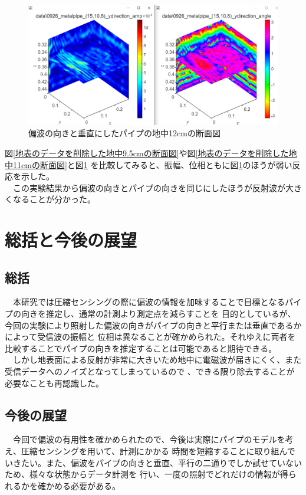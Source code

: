 \documentclass[12pt,a4paper]{jsreport}
\begin{document}
        \begin{figure}[h]
          \begin{center}
           \includegraphics[width=14cm]{dataimage/matlab/0918_metalpipe_(15,10,8)_ydirection_d=35cm_delete_unnecessary.png}
          \caption{偏波の向きと垂直にしたパイプの地中12cmの断面図}\label{偏波の向きと垂直にしたパイプの地中12.5cmの断面図}
          \end{center}
          \end{figure}

図\ref{地表のデータを削除した地中9.5cmの断面図}や図\ref{地表のデータを削除した地中11cmの断面図}と図\ref{偏波の向きと垂直にしたパイプの地中12.5cmの断面図}
を比較してみると、振幅、位相ともに図\ref{偏波の向きと垂直にしたパイプの地中12.5cmの断面図}のほうが弱い反応を示した。
\\　この実験結果から偏波の向きとパイプの向きを同じにしたほうが反射波が大きくなることが分かった。

\clearpage
\chapter{総括と今後の展望}
\section{総括}
　本研究では圧縮センシングの際に偏波の情報を加味することで目標となるパイプの向きを推定し、通常の計測より測定点を減らすことを
目的としているが、今回の実験により照射した偏波の向きがパイプの向きと平行または垂直であるかによって受信波の振幅と
位相は異なることが確かめられた。それゆえに両者を比較することでパイプの向きを推定することは可能であると期待できる。
\\　しかし地表面による反射が非常に大きいため地中に電磁波が届きにくく、また受信データへのノイズとなってしまっているので
、できる限り除去することが必要なことも再認識した。
\section{今後の展望}
　今回で偏波の有用性を確かめられたので、今後は実際にパイプのモデルを考え、圧縮センシングを用いて、計測にかかる
時間を短縮することに取り組んでいきたい。また、偏波をパイプの向きと垂直、平行の二通りでしか試せていないため、様々な状態からデータ計測を
行い、一度の照射でどれだけの情報が得られるかを確かめる必要がある。
\end{document}
